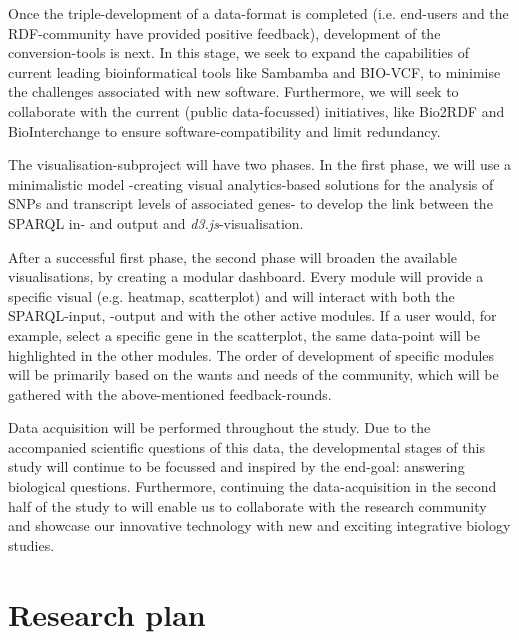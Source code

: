 \documentclass[twoside,fontsize=10pt]{article}
\begin{document}
Once the triple-development of a data-format is completed (i.e. end-users and the RDF-community have provided positive feedback), development of the conversion-tools is next. In this stage, we seek to expand the capabilities of current leading bioinformatical tools like Sambamba\cite{Tarasov2014} and BIO-VCF\cite{Goto2010}, to minimise the challenges associated with new software. Furthermore, we will seek to collaborate with the current (public data-focussed) initiatives, like Bio2RDF\cite{Belleau2008} and BioInterchange\cite{Baran} to ensure software-compatibility and limit redundancy.
\medskip

\noindent
The visualisation-subproject will have two phases. In the first phase, we will use a minimalistic model -creating visual analytics-based solutions for the analysis of SNPs and transcript levels of associated genes- to develop the link between the SPARQL in- and output and \textit{d3.js}-visualisation. 

After a successful first phase, the second phase will broaden the available visualisations, by creating a modular dashboard. Every module will provide a specific visual (e.g. heatmap, scatterplot) and will interact with both the SPARQL-input, -output and with the other active modules. If a user would, for example, select a specific gene in the scatterplot, the same data-point will be highlighted in the other modules. The order of development of specific modules will be primarily based on the wants and needs of the community, which will be gathered with the above-mentioned feedback-rounds.
\medskip

\noindent
Data acquisition will be performed throughout the study. Due to the accompanied scientific questions of this data, the developmental stages of this study will continue to be focussed and inspired by the end-goal: answering biological questions. Furthermore, continuing the data-acquisition in the second half of the study to will enable us to collaborate with the research community and showcase our innovative technology with new and exciting integrative biology studies.
\newpage
\section*{Research plan}
\end{document}

